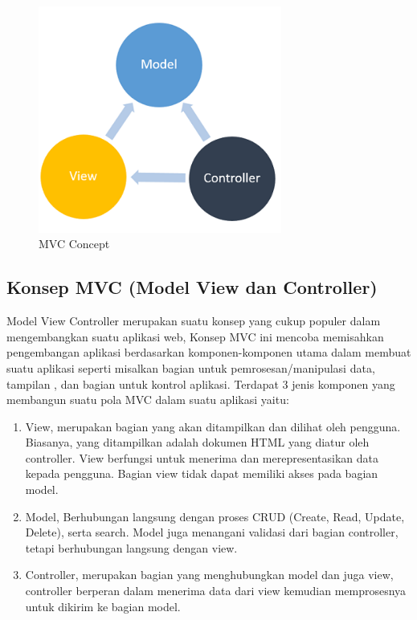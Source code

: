 	\begin{figure}[H]
		\includegraphics[width=8cm]{figures/web/mvc.png}
		\centering
		\caption{MVC Concept}
	\end{figure}
\subsection{Konsep MVC (Model View dan Controller)}
Model View Controller merupakan suatu konsep yang cukup populer dalam mengembangkan suatu aplikasi web, Konsep MVC ini mencoba memisahkan pengembangan aplikasi berdasarkan komponen-komponen utama dalam membuat suatu aplikasi seperti misalkan bagian untuk pemrosesan/manipulasi data, tampilan , dan bagian untuk kontrol aplikasi. Terdapat 3 jenis komponen yang membangun suatu pola MVC dalam suatu aplikasi yaitu: 
\begin{enumerate}
	\item View, merupakan bagian yang akan ditampilkan dan dilihat oleh pengguna. Biasanya, yang ditampilkan adalah dokumen HTML yang diatur oleh controller. View berfungsi untuk menerima dan merepresentasikan data kepada pengguna. Bagian view tidak dapat memiliki akses pada bagian model.
	\item Model, Berhubungan langsung dengan proses CRUD (Create, Read, Update, Delete), serta search. Model juga menangani validasi dari bagian controller, tetapi berhubungan langsung dengan view.
	\item Controller, merupakan bagian yang menghubungkan model dan juga view, controller berperan dalam menerima data dari view kemudian memprosesnya untuk dikirim ke bagian model.
\end{enumerate}

